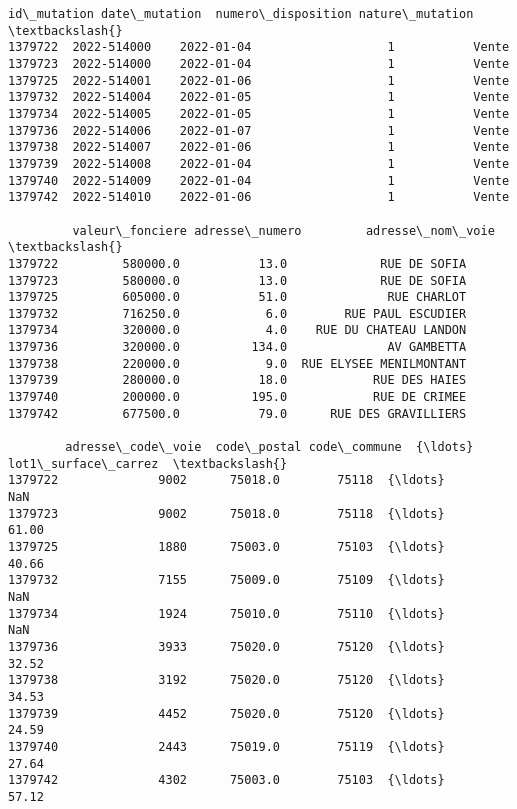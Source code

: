 \documentclass[11pt]{article}
\makeatletter
\newcommand{\boxspacing}{\kern\kvtcb@left@rule\kern\kvtcb@boxsep}
\newcommand{\prompt}[4]{
        {\ttfamily\llap{{\color{#2}[#3]:\hspace{3pt}#4}}\vspace{-\baselineskip}}
    }
\makeatother
\begin{document}
            \begin{tcolorbox}[breakable, size=fbox, boxrule=.5pt, pad at break*=1mm, opacityfill=0]
\prompt{Out}{outcolor}{15}{\boxspacing}
\begin{Verbatim}[commandchars=\\\{\}]
         id\_mutation date\_mutation  numero\_disposition nature\_mutation  \textbackslash{}
1379722  2022-514000    2022-01-04                   1           Vente
1379723  2022-514000    2022-01-04                   1           Vente
1379725  2022-514001    2022-01-06                   1           Vente
1379732  2022-514004    2022-01-05                   1           Vente
1379734  2022-514005    2022-01-05                   1           Vente
1379736  2022-514006    2022-01-07                   1           Vente
1379738  2022-514007    2022-01-06                   1           Vente
1379739  2022-514008    2022-01-04                   1           Vente
1379740  2022-514009    2022-01-04                   1           Vente
1379742  2022-514010    2022-01-06                   1           Vente

         valeur\_fonciere adresse\_numero         adresse\_nom\_voie  \textbackslash{}
1379722         580000.0           13.0             RUE DE SOFIA
1379723         580000.0           13.0             RUE DE SOFIA
1379725         605000.0           51.0              RUE CHARLOT
1379732         716250.0            6.0        RUE PAUL ESCUDIER
1379734         320000.0            4.0    RUE DU CHATEAU LANDON
1379736         320000.0          134.0              AV GAMBETTA
1379738         220000.0            9.0  RUE ELYSEE MENILMONTANT
1379739         280000.0           18.0            RUE DES HAIES
1379740         200000.0          195.0            RUE DE CRIMEE
1379742         677500.0           79.0      RUE DES GRAVILLIERS

        adresse\_code\_voie  code\_postal code\_commune  {\ldots} lot1\_surface\_carrez  \textbackslash{}
1379722              9002      75018.0        75118  {\ldots}                 NaN
1379723              9002      75018.0        75118  {\ldots}               61.00
1379725              1880      75003.0        75103  {\ldots}               40.66
1379732              7155      75009.0        75109  {\ldots}                 NaN
1379734              1924      75010.0        75110  {\ldots}                 NaN
1379736              3933      75020.0        75120  {\ldots}               32.52
1379738              3192      75020.0        75120  {\ldots}               34.53
1379739              4452      75020.0        75120  {\ldots}               24.59
1379740              2443      75019.0        75119  {\ldots}               27.64
1379742              4302      75003.0        75103  {\ldots}               57.12


\end{Verbatim}
\end{tcolorbox}
\end{document}
